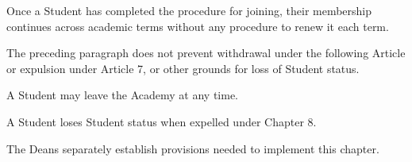 \begin{articles}
\begin{paragraphs}
  \end{paragraphs}
  \item Once a Student has completed the procedure for joining, their membership continues across academic terms without any procedure to renew it each term.
  \begin{paragraphs}
    \item The preceding paragraph does not prevent withdrawal under the following Article or expulsion under Article 7, or other grounds for loss of Student status.
  \end{paragraphs}
  \item A Student may leave the Academy at any time.
  \item A Student loses Student status when expelled under Chapter 8.
  \item The Deans separately establish provisions needed to implement this chapter.
\end{articles}
